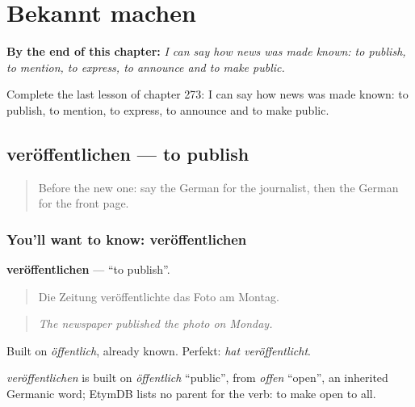 
\chapter{Bekannt machen}
\label{ch:ge-bekannt-machen}

\begin{chapteropening}
\textbf{By the end of this chapter:} \emph{I can say how news was made known: to publish, to mention, to express, to announce and to make public.}

Complete the last lesson of chapter 273: I can say how news was made known: to publish, to mention, to express, to announce and to make public.
\end{chapteropening}

\section[veröffentlichen]{veröffentlichen — to publish}

\label{lesson:GE-C273-veroeffentlichen}



\begin{quote}
Before the new one: say the German for the journalist, then the German for the front page.
\end{quote}

\subsection*{You'll want to know: veröffentlichen}
\textbf{veröffentlichen} — \textquotedblleft{}to publish\textquotedblright{}.

\begin{quote}
Die Zeitung veröffentlichte das Foto am Montag.
\end{quote}

\begin{quote}
\emph{The newspaper published the photo on Monday.}
\end{quote}

Built on \emph{öffentlich}, already known. Perfekt: \emph{hat veröffentlicht}.

\begin{cousinweb}
\emph{veröffentlichen} is built on \emph{öffentlich} \textquotedblleft{}public\textquotedblright{}, from \emph{offen} \textquotedblleft{}open\textquotedblright{}, an inherited Germanic word; EtymDB lists no parent for the verb: to make open to all.
\end{cousinweb}

